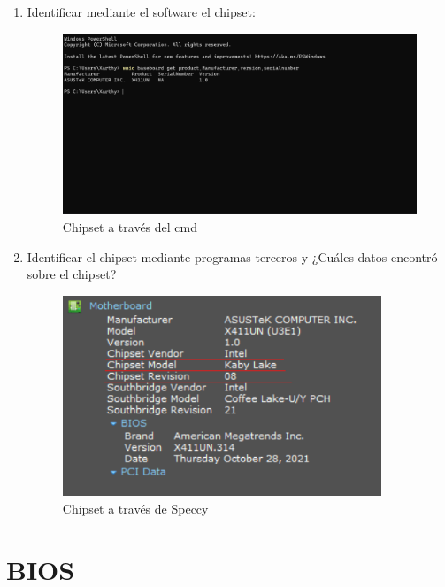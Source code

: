 \documentclass[stu, 12pt, letterpaper, donotrepeattitle, floatsintext, natbib, helv]{apa7}
\begin{document}
\begin{enumerate}
    \item Identificar mediante el software el chipset:
    \begin{figure}[H]
        \includegraphics[width=1\textwidth]{wmic_cmd_details.png}
        \caption{Chipset a través del cmd}
        \label{fig:cmdFig}
    \end{figure}
    \item Identificar el chipset mediante programas terceros y ¿Cuáles datos encontró sobre el chipset?
    \begin{figure}[H]
        \includegraphics[width=0.9\textwidth]{Speccy.png}
        \caption{Chipset a través de Speccy}
        \label{fig:speccyFig}
    \end{figure}
\end{enumerate}

\section*{BIOS}
{}
\end{document}
